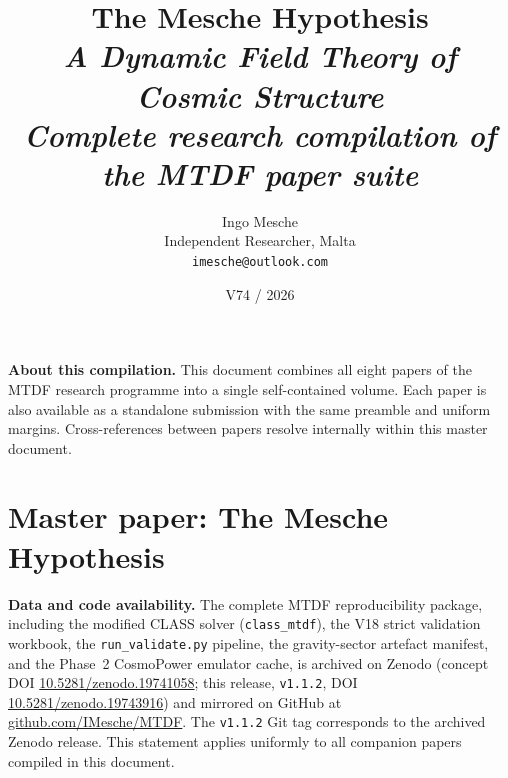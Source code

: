 \documentclass[11pt,a4paper]{article}
\title{\textbf{The Mesche Hypothesis}\\[6pt]
  \normalsize\itshape A Dynamic Field Theory of Cosmic Structure\\[2pt]
  \normalsize Complete research compilation of the MTDF paper suite}
\author{Ingo Mesche\\ \small Independent Researcher, Malta \\ \small \texttt{imesche@outlook.com}}
\date{V74 / 2026}
\begin{document}
\maketitle

\vspace{1em}
\begin{center}
\begin{minipage}{0.85\textwidth}
\noindent\textbf{About this compilation.} This document combines all eight papers of the MTDF research programme into a single self-contained volume. Each paper is also available as a standalone submission with the same preamble and uniform margins. Cross-references between papers resolve internally within this master document.
\end{minipage}
\end{center}
\vspace{1em}

\tableofcontents
\clearpage


\part{Master paper: The Mesche Hypothesis}

\noindent\textbf{Data and code availability.}
The complete MTDF reproducibility package, including the modified CLASS solver
(\texttt{class\_\allowbreak{}mtdf}), the V18 strict validation workbook, the
\texttt{run\_\allowbreak{}validate.py} pipeline, the gravity-sector artefact
manifest, and the Phase~2 CosmoPower emulator cache, is archived on Zenodo
(concept DOI \href{https://doi.org/10.5281/zenodo.19741058}{10.5281/\allowbreak{}zenodo.\allowbreak{}19741058};
this release, \texttt{v1.1.2}, DOI
\href{https://doi.org/10.5281/zenodo.19743916}{10.5281/\allowbreak{}zenodo.\allowbreak{}19743916})
and mirrored on GitHub at
\href{https://github.com/IMesche/MTDF}{github.com/\allowbreak{}IMesche/\allowbreak{}MTDF}.
The \texttt{v1.1.2} Git tag corresponds to the archived Zenodo release. This
statement applies uniformly to all companion papers compiled in this document.
\end{document}
